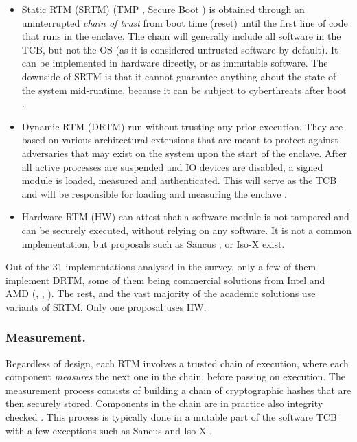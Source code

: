 \documentclass[runningheads,a4paper]{uwsese}
\begin{document}
\begin{itemize}
    \item Static RTM (SRTM) (TMP \cite{tee_tcg_arch_overview},
        Secure Boot \cite{windows-driver-content2023Dec}) is obtained
        through an uninterrupted \emph{chain of trust} from boot time
        (reset) until the first line of code that runs in the enclave. The
        chain will generally include all software in the TCB, but not the
        OS (as it is considered untrusted software by default). It can be
        implemented in hardware directly, or as immutable software. The
        downside of SRTM is that it cannot guarantee anything about the
        state of the system mid-runtime, because it can be subject to
        cyberthreats after boot \cite{tee_smart_rot} \cite{tee_hw_sup}.
    \item Dynamic RTM (DRTM) run without trusting any prior execution. They are
        based on various architectural extensions that are meant to protect
        against adversaries that may exist on the system upon the start of the
        enclave. After all active processes are suspended and IO devices are
        disabled, a signed module is loaded, measured and authenticated. This
        will serve as the TCB and will be responsible for loading and measuring
        the enclave \cite{tee_hw_sup}.
    \item Hardware RTM (HW) can attest that a software module is not tampered
        and can be securely executed, without relying on any software. It is
        not a common implementation, but proposals such as Sancus
        \cite{tee_sancus}, or Iso-X \cite{tee_isox} exist. 
\end{itemize}

Out of the 31 implementations analysed in the survey, only a few
of them implement DRTM, some of them being commercial solutions from Intel and
AMD (\cite{arm_tz}, \cite{intel_tdx}, \cite{intel_sgx}). The rest, and the
vast majority of the academic solutions use variants of SRTM. Only one proposal
uses HW.

\subsubsection{Measurement.}

Regardless of design, each RTM involves a trusted chain of execution, where
each component \emph{measures} the next one in the chain, before passing on
execution. The measurement process consists of building a chain of
cryptographic hashes that are then securely stored. Components in the chain are
in practice also integrity checked \cite{tee_hw_sup}. This process is typically
done in a mutable part of the software TCB with a few exceptions
\label{hw_exp} such as Sancus \cite{tee_sancus} and Iso-X
\cite{tee_isox}.
\end{document}
